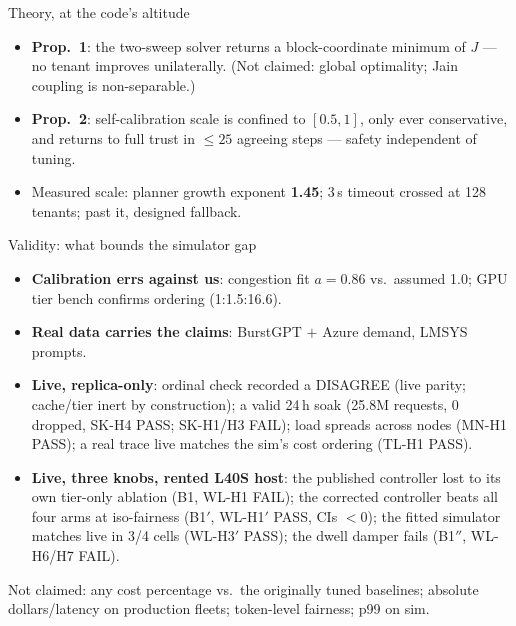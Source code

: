 \documentclass[aspectratio=169,11pt]{beamer}
\begin{document}
\begin{frame}{Theory, at the code's altitude}
  \begin{itemize}
    \item \textbf{Prop.\ 1}: the two-sweep solver returns a
          block-coordinate minimum of $J$ --- no tenant improves
          unilaterally. (Not claimed: global optimality; Jain coupling is
          non-separable.)
    \item \textbf{Prop.\ 2}: self-calibration scale is confined to
          $[0.5,1]$, only ever conservative, and returns to full trust in
          $\le 25$ agreeing steps --- safety independent of tuning.
    \item Measured scale: planner growth exponent \textbf{1.45}; 3\,s
          timeout crossed at 128 tenants; past it, designed fallback.
  \end{itemize}
\end{frame}

\begin{frame}{Validity: what bounds the simulator gap}
  \begin{itemize}
    \item \textbf{Calibration errs against us}: congestion fit $a{=}0.86$
          vs.\ assumed 1.0; GPU tier bench confirms ordering (1:1.5:16.6).
    \item \textbf{Real data carries the claims}: BurstGPT $+$ Azure demand,
          LMSYS prompts.
    \item \textbf{Live, replica-only}: ordinal check recorded a
          \alert{DISAGREE} (live parity; cache/tier inert by construction);
          a valid 24\,h soak (25.8M requests, 0 dropped, SK-H4 PASS;
          SK-H1/H3 \alert{FAIL}); load spreads across nodes (MN-H1 PASS); a
          real trace live matches the sim's cost ordering (TL-H1 PASS).
    \item \textbf{Live, three knobs, rented L40S host}: the published
          controller \alert{lost to its own tier-only ablation} (B1, WL-H1
          FAIL); the corrected controller beats all four arms at
          iso-fairness (B1$'$, WL-H1$'$ PASS, CIs $<0$); the fitted
          simulator matches live in 3/4 cells (WL-H3$'$ PASS); the dwell
          damper \alert{fails} (B1$''$, WL-H6/H7 FAIL).
  \end{itemize}
  \vfill
  Not claimed: any cost percentage vs.\ the originally tuned baselines;
  absolute dollars/latency on production fleets; token-level fairness;
  p99 on sim.
\end{frame}
\end{document}
